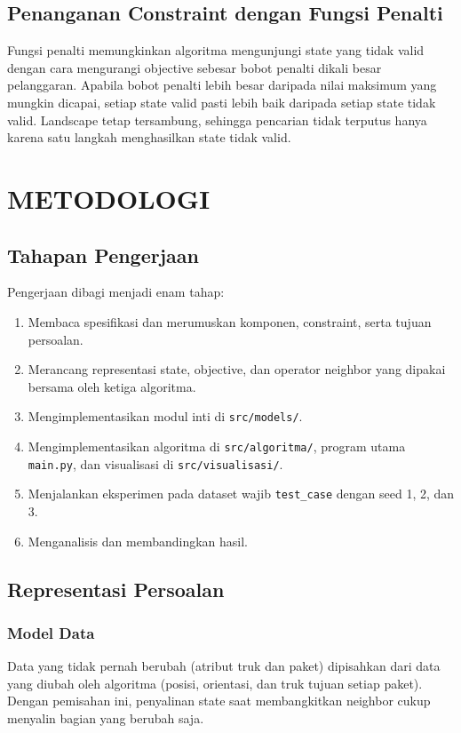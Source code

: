 \documentclass[12pt,a4paper]{report}
\newcommand{\code}[1]{\texttt{\small #1}}
\begin{document}
\section{Penanganan Constraint dengan Fungsi Penalti}
Fungsi penalti memungkinkan algoritma mengunjungi state yang tidak valid dengan cara
mengurangi objective sebesar bobot penalti dikali besar pelanggaran. Apabila bobot penalti lebih
besar daripada nilai maksimum yang mungkin dicapai, setiap state valid pasti lebih baik daripada
setiap state tidak valid. Landscape tetap tersambung, sehingga pencarian tidak terputus hanya
karena satu langkah menghasilkan state tidak valid.

\chapter{METODOLOGI}

\section{Tahapan Pengerjaan}
Pengerjaan dibagi menjadi enam tahap:
\begin{enumerate}[leftmargin=1.5cm]
  \item Membaca spesifikasi dan merumuskan komponen, constraint, serta tujuan persoalan.
  \item Merancang representasi state, objective, dan operator neighbor yang dipakai bersama oleh ketiga algoritma.
  \item Mengimplementasikan modul inti di \code{src/models/}.
  \item Mengimplementasikan algoritma di \code{src/algoritma/}, program utama \code{main.py}, dan visualisasi di \code{src/visualisasi/}.
  \item Menjalankan eksperimen pada dataset wajib \code{test\_case} dengan seed 1, 2, dan 3.
  \item Menganalisis dan membandingkan hasil.
\end{enumerate}

\section{Representasi Persoalan}
\subsection{Model Data}
Data yang tidak pernah berubah (atribut truk dan paket) dipisahkan dari data yang diubah oleh
algoritma (posisi, orientasi, dan truk tujuan setiap paket). Dengan pemisahan ini, penyalinan
state saat membangkitkan neighbor cukup menyalin bagian yang berubah saja.
\end{document}
